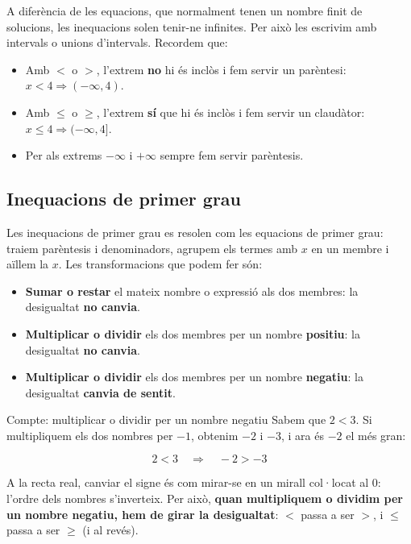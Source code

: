A diferència de les equacions, que normalment tenen un nombre finit de solucions, les inequacions solen tenir-ne infinites. Per això les escrivim amb intervals o unions d'intervals. Recordem que:

\begin{itemize}
\item Amb $<$ o $>$, l'extrem \textbf{no} hi és inclòs i fem servir un parèntesi: $x<4 \Rightarrow (-\infty,4)$.
\item Amb $\leq$ o $\geq$, l'extrem \textbf{sí} que hi és inclòs i fem servir un claudàtor: $x\leq 4 \Rightarrow (-\infty,4]$.
\item Per als extrems $-\infty$ i $+\infty$ sempre fem servir parèntesis.
\end{itemize}

\subsection{Inequacions de primer grau}

Les inequacions de primer grau es resolen com les equacions de primer grau: traiem parèntesis i denominadors, agrupem els termes amb $x$ en un membre i aïllem la $x$. Les transformacions que podem fer són:

\begin{itemize}
\item \textbf{Sumar o restar} el mateix nombre o expressió als dos membres: la desigualtat \textbf{no canvia}.
\item \textbf{Multiplicar o dividir} els dos membres per un nombre \textbf{positiu}: la desigualtat \textbf{no canvia}.
\item \textbf{Multiplicar o dividir} els dos membres per un nombre \textbf{negatiu}: la desigualtat \textbf{canvia de sentit}.
\end{itemize}

\begin{compte}{Compte: multiplicar o dividir per un nombre negatiu}
Sabem que $2<3$. Si multipliquem els dos nombres per $-1$, obtenim $-2$ i $-3$, i ara és $-2$ el més gran:

\[
2<3 \quad\Rightarrow\quad -2>-3
\]

A la recta real, canviar el signe és com mirar-se en un mirall col·locat al $0$: l'ordre dels nombres s'inverteix. Per això, \textbf{quan multipliquem o dividim per un nombre negatiu, hem de girar la desigualtat}: $<$ passa a ser $>$, i $\leq$ passa a ser $\geq$ (i al revés).
\end{compte}

